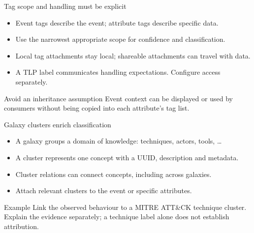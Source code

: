\begin{frame}{Tag scope and handling must be explicit}
  \begin{itemize}
    \item Event tags describe the event; attribute tags describe specific data.
    \item Use the narrowest appropriate scope for confidence and classification.
    \item Local tag attachments stay local; shareable attachments can travel with data.
    \item A TLP label communicates handling expectations. Configure access separately.
  \end{itemize}
  \begin{block}{Avoid an inheritance assumption}
    Event context can be displayed or used by consumers without being copied into each attribute's tag list.
  \end{block}
\end{frame}

\begin{frame}{Galaxy clusters enrich classification}
  \begin{itemize}
    \item A galaxy groups a domain of knowledge: techniques, actors, tools, \ldots
    \item A cluster represents one concept with a UUID, description and metadata.
    \item Cluster relations can connect concepts, including across galaxies.
    \item Attach relevant clusters to the event or specific attributes.
  \end{itemize}
  \begin{block}{Example}
    Link the observed behaviour to a MITRE ATT\&CK technique cluster.\\
    Explain the evidence separately; a technique label alone does not establish attribution.
  \end{block}
\end{frame}

